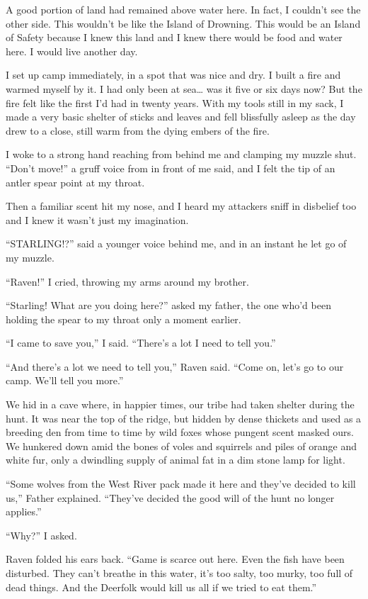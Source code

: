 A good portion of land had remained above water here. In fact, I couldn't see the other side. This wouldn't be like the Island of Drowning. This would be an Island of Safety because I knew this land and I knew there would be food and water here. I would live another day.

I set up camp immediately, in a spot that was nice and dry. I built a fire and warmed myself by it. I had only been at sea\ldots{} was it five or six days now? But the fire felt like the first I'd had in twenty years. With my tools still in my sack, I made a very basic shelter of sticks and leaves and fell blissfully asleep as the day drew to a close, still warm from the dying embers of the fire.

I woke to a strong hand reaching from behind me and clamping my muzzle shut. ``Don't move!'' a gruff voice from in front of me said, and I felt the tip of an antler spear point at my throat.

Then a familiar scent hit my nose, and I heard my attackers sniff in disbelief too and I knew it wasn't just my imagination.

``STARLING!?'' said a younger voice behind me, and in an instant he let go of my muzzle.

``Raven!'' I cried, throwing my arms around my brother.

``Starling! What are you doing here?'' asked my father, the one who'd been holding the spear to my throat only a moment earlier.

``I came to save you,'' I said. ``There's a lot I need to tell you.''

``And there's a lot we need to tell you,'' Raven said. ``Come on, let's go to our camp. We'll tell you more.''

\secdiv

We hid in a cave where, in happier times, our tribe had taken shelter during the hunt. It was near the top of the ridge, but hidden by dense thickets and used as a breeding den from time to time by wild foxes whose pungent scent masked ours. We hunkered down amid the bones of voles and squirrels and piles of orange and white fur, only a dwindling supply of animal fat in a dim stone lamp for light.

``Some wolves from the West River pack made it here and they've decided to kill us,'' Father explained. ``They've decided the good will of the hunt no longer applies.''

``Why?'' I asked.

Raven folded his ears back. ``Game is scarce out here. Even the fish have been disturbed. They can't breathe in this water, it's too salty, too murky, too full of dead things. And the Deerfolk would kill us all if we tried to eat them.''

